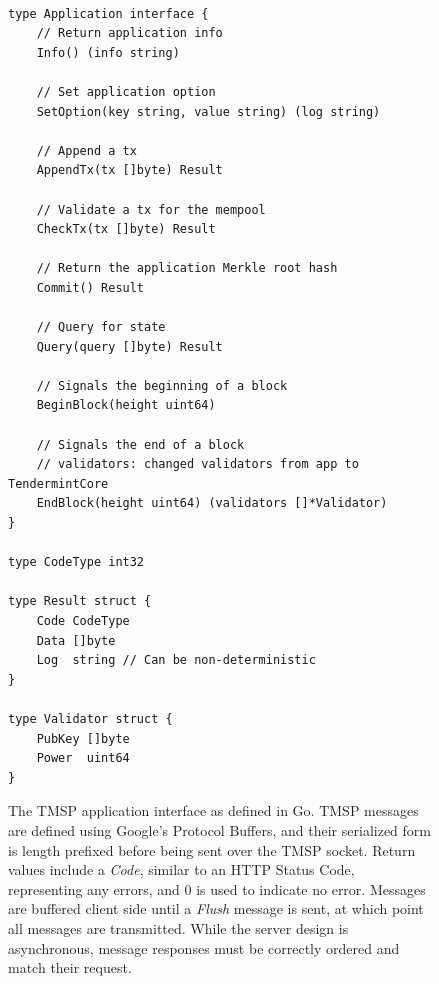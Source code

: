 \begin{figure}[]
\vspace*{-1.5in}
    	\centering
\begin{verbatim}

type Application interface {
	// Return application info
	Info() (info string)

	// Set application option
	SetOption(key string, value string) (log string)

	// Append a tx
	AppendTx(tx []byte) Result

	// Validate a tx for the mempool
	CheckTx(tx []byte) Result

	// Return the application Merkle root hash
	Commit() Result

	// Query for state
	Query(query []byte) Result

	// Signals the beginning of a block
	BeginBlock(height uint64) 

	// Signals the end of a block
	// validators: changed validators from app to TendermintCore
	EndBlock(height uint64) (validators []*Validator)
}

type CodeType int32

type Result struct {
	Code CodeType
	Data []byte
	Log  string // Can be non-deterministic
}

type Validator struct {
	PubKey []byte 
	Power  uint64 
}
\end{verbatim}
	\caption[TMSP Message Types]{
The TMSP application interface as defined in Go.
TMSP messages are defined using Google's Protocol Buffers, and their serialized form is length prefixed before 
being sent over the TMSP socket. 
Return values include a \emph{Code}, similar to an HTTP Status Code, representing any errors,
and $0$ is used to indicate no error.
Messages are buffered client side until a \emph{Flush} message is sent,
at which point all messages are transmitted. While the server design is asynchronous, message responses must be correctly ordered and match their request.
}
	\label{fig:tmsp_msgs}
\end{figure}


